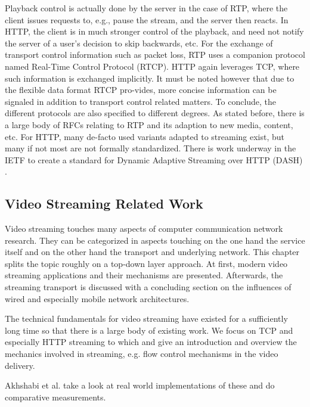 Playback control is actually done by the server in the case of RTP, where the client issues requests to, e.g., pause the stream, and the server then reacts. In HTTP, the client is in much stronger control of the playback, and need not notify the server of a user’s decision to skip backwards, etc. 
For the exchange of transport control information such as packet loss, RTP uses a companion protocol named Real-Time Control Protocol (RTCP). HTTP again leverages TCP, where such information is exchanged implicitly. It must be noted however that due to the flexible data format RTCP pro-vides, more concise information can be signaled in addition to transport control related matters.
To conclude, the different protocols are also specified to different degrees. As stated before, there is a large body of RFCs relating to RTP and its adaption to new media, content, etc. For HTTP, many de-facto used variants adapted to streaming exist, but many if not most are not formally standardized. There is work underway in the IETF to create a standard for Dynamic Adaptive Streaming over HTTP (DASH) .





\subsection{Video Streaming Related Work}

Video streaming touches many aspects of computer communication network research. They can be categorized in aspects touching on the one hand the service itself and on the other hand  the transport and underlying network. This chapter splits the topic roughly on a top-down layer approach. At first, modern video streaming applications and their mechanisms are presented. Afterwards, the streaming transport is discussed with a concluding section on the influences of wired and especially mobile network architectures.


The technical fundamentals for video streaming have existed for a sufficiently long time so that there is a large body of existing work. We focus on TCP and especially HTTP streaming to which \cite{watching-video1} and \cite{ma2011mobile} give an introduction and overview the mechanics involved in streaming, e.g. flow control mechanisms in the video delivery.

Akhshabi et al. \cite{akhshabi2011experimental} take a look at real world implementations of these and do comparative measurements.

